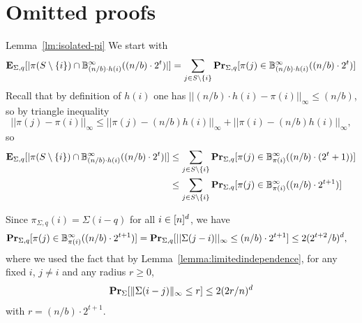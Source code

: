 \section{Omitted proofs}\label{app:A}

\begin{proofof}{Lemma~\ref{lm:isolated-pi}}
We start with
\begin{equation}\label{eq:lixchbsp}
\begin{split}
{\bf \mbox{\bf E}}_{\Sigma, q}[|\pi(S\setminus \{i\})\cap \mathbb{B}^\infty_{(n/b)\cdot h(i)}((n/b)\cdot 2^t)|]&=\sum_{j\in S\setminus \{i\}} {\bf \mbox{\bf Pr}}_{\Sigma, q}[\pi(j)\in  \mathbb{B}^\infty_{(n/b)\cdot h(i)}((n/b)\cdot 2^t)]\\
\end{split}
\end{equation}
Recall that by definition of $h(i)$ one has $||(n/b)\cdot h(i)-\pi(i)||_\infty\leq (n/b)$, so by triangle inequality 
$$
||\pi(j)-\pi(i)||_\infty\leq ||\pi(j)-(n/b)h(i)||_\infty+||\pi(i)-(n/b)h(i)||_\infty,
$$
so
\begin{equation}\label{eq:lixchbs}
\begin{split}
{\bf \mbox{\bf E}}_{\Sigma, q}[|\pi(S\setminus \{i\})\cap \mathbb{B}^\infty_{(n/b)\cdot h(i)}((n/b)\cdot 2^t)|]&\leq \sum_{j\in S\setminus \{i\}} {\bf \mbox{\bf Pr}}_{\Sigma, q}[\pi(j)\in  \mathbb{B}^\infty_{\pi(i)}((n/b)\cdot (2^t+1))]\\
&\leq \sum_{j\in S\setminus \{i\}} {\bf \mbox{\bf Pr}}_{\Sigma, q}[\pi(j)\in  \mathbb{B}^\infty_{\pi(i)}((n/b)\cdot 2^{t+1})]\\
\end{split}
\end{equation}

Since $\pi_{\Sigma, q}(i)=\Sigma(i-q)$ for all $i\in {[n]^d}$, we have
\begin{equation*}
\begin{split}
{\bf \mbox{\bf Pr}}_{\Sigma, q}[\pi(j)\in  \mathbb{B}^\infty_{\pi(i)}((n/b)\cdot 2^{t+1})]&={\bf \mbox{\bf Pr}}_{\Sigma, q}[||\Sigma(j-i)||_\infty\leq (n/b)\cdot 2^{t+1}]\leq 2(2^{t+2}/b)^d,
\end{split}
\end{equation*}
where we used the fact that by Lemma~\ref{lemma:limitedindependence}, for any fixed $i$, $j\neq i$ and any radius $r\geq 0$,
\begin{equation}\label{eq:li}
 {\bf \mbox{\bf Pr}}_{\Sigma}[\lVert\Sigma(i-j)\rVert_{\infty} \leq r] \leq 2(2r/n)^d
\end{equation}
with $r=(n/b)\cdot 2^{t+1}$.


\end{proofof}
